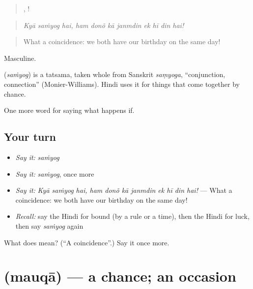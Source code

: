\begin{quote}
  ,        !
\end{quote}

\begin{quote}
\emph{Kyā saṁyog hai, ham donõ kā janmdin ek hī din hai!}
\end{quote}

\begin{quote}
What a coincidence: we both have our birthday on the same day!
\end{quote}

Masculine.

\begin{cousinweb}
\textbf{} (\emph{saṁyog}) is a tatsama, taken whole from Sanskrit \emph{saṃyoga}, \textquotedblleft{}conjunction, connection\textquotedblright{} (Monier-Williams). Hindi uses it for things that come together by chance.
\end{cousinweb}

\begin{grammarlens}[title={What you've built}]
One more word for saying what happens if.
\end{grammarlens}

\subsection*{Your turn}
\begin{itemize}
\raggedright
  \item \emph{Say it:} \emph{saṁyog}
  \item \emph{Say it:} \emph{saṁyog}, once more
  \item \emph{Say it:} \emph{Kyā saṁyog hai, ham donõ kā janmdin ek hī din hai!} — What a coincidence: we both have our birthday on the same day!
  \item \emph{Recall:} say the Hindi for bound (by a rule or a time), then the Hindi for luck, then say \emph{saṁyog} again
\end{itemize}

\begin{tcolorbox}[breakable,colback=teal!4,colframe=teal!35!black,title={Before you move on}]
What does  mean? (\textquotedblleft{}A coincidence\textquotedblright{}.) Say it once more.
\end{tcolorbox}
\section[\texorpdfstring{\hi{मौक़ा} (mauqā)}{मौक़ा (mauqā)}]{ (mauqā) — a chance; an occasion}

